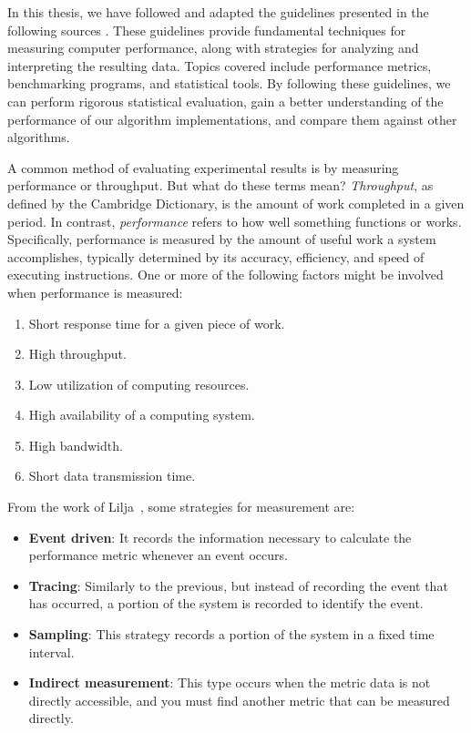 In this thesis, we have followed and adapted the guidelines presented in the following sources \cite{forsyth2018probability, DBLP_conf_oopsla_GeorgesBE07,lilja2005measuring}. These guidelines provide fundamental techniques for measuring computer performance, along with strategies for analyzing and interpreting the resulting data. Topics covered include performance metrics, benchmarking programs, and statistical tools. By following these guidelines, we can perform rigorous statistical evaluation, gain a better understanding of the performance of our algorithm implementations, and compare them against other algorithms.

A common method of evaluating experimental results is by measuring performance or throughput. But what do these terms mean? \emph{Throughput}, as defined by the Cambridge Dictionary, is the amount of work completed in a given period. In contrast, \emph{performance} refers to how well something functions or works. Specifically, performance is measured by the amount of useful work a system accomplishes, typically determined by its accuracy, efficiency, and speed of executing instructions. One or more of the following factors might be involved when performance is measured:

\begin{enumerate}
\item Short response time for a given piece of work.
\item High throughput.
\item Low utilization of computing resources.
\item High availability of a computing system.
\item High bandwidth.
\item Short data transmission time.
\end{enumerate}

From the work of Lilja~\cite{lilja2005measuring}, some strategies for measurement are:

\begin{itemize}
\item \textbf{Event driven}: It records the information necessary to calculate the
performance metric whenever an event occurs.
\item \textbf{Tracing}: Similarly to the previous, but instead of recording the event
that has occurred, a portion of the system is recorded to identify the event.
\item \textbf{Sampling}: This strategy records a portion of the system in a fixed time
interval.
\item \textbf{Indirect measurement}: This type occurs when the metric data is not
directly accessible, and you must find another metric that can be measured
directly.
\end{itemize}

